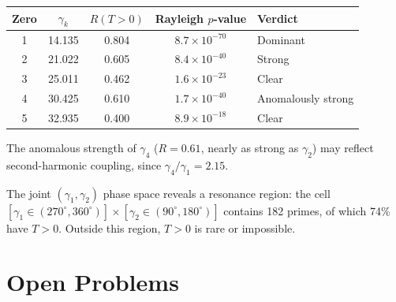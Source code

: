 \documentclass[11pt]{article}
\theoremstyle{definition}
\begin{document}
\begin{center}
\begin{tabular}{ccccl}
\toprule
Zero & $\gamma_k$ & $R(T{>}0)$ & Rayleigh $p$-value & Verdict \\
\midrule
1 & 14.135 & 0.804 & $8.7 \times 10^{-70}$ & Dominant \\
2 & 21.022 & 0.605 & $8.4 \times 10^{-40}$ & Strong \\
3 & 25.011 & 0.462 & $1.6 \times 10^{-23}$ & Clear \\
4 & 30.425 & 0.610 & $1.7 \times 10^{-40}$ & Anomalously strong \\
5 & 32.935 & 0.400 & $8.9 \times 10^{-18}$ & Clear \\
\bottomrule
\end{tabular}
\end{center}

The anomalous strength of $\gamma_4$ ($R = 0.61$, nearly as strong as
$\gamma_2$) may reflect second-harmonic coupling, since
$\gamma_4/\gamma_1 = 2.15$.

The joint $(\gamma_1, \gamma_2)$ phase space reveals a resonance
region: the cell $[\gamma_1 \in (270^\circ, 360^\circ)] \times
[\gamma_2 \in (90^\circ, 180^\circ)]$ contains 182 primes, of
which 74\% have $T > 0$.  Outside this region, $T > 0$ is rare or
impossible.



\section{Open Problems}\label{sec:open}
\end{document}

